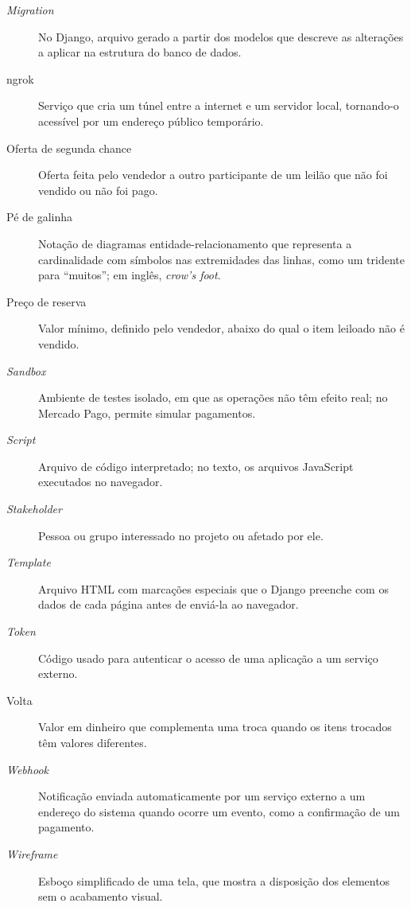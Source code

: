 \documentclass[
  12pt,
  a4paper,
  oneside,
  chapter=TITLE,
  subsection=TITLE,
  sumario=abnt-6027-2012,
  english,
  brazil
]{abntex2}
\begin{document}
\begin{description}
  \item[\emph{Migration}] No Django, arquivo gerado a partir dos modelos que descreve as alterações a aplicar na estrutura do banco de dados.
  \item[ngrok] Serviço que cria um túnel entre a internet e um servidor local, tornando-o acessível por um endereço público temporário.
  \item[Oferta de segunda chance] Oferta feita pelo vendedor a outro participante de um leilão que não foi vendido ou não foi pago.
  \item[Pé de galinha] Notação de diagramas entidade-relacionamento que representa a cardinalidade com símbolos nas extremidades das linhas, como um tridente para ``muitos''; em inglês, \emph{crow's foot}.
  \item[Preço de reserva] Valor mínimo, definido pelo vendedor, abaixo do qual o item leiloado não é vendido.
  \item[\emph{Sandbox}] Ambiente de testes isolado, em que as operações não têm efeito real; no Mercado Pago, permite simular pagamentos.
  \item[\emph{Script}] Arquivo de código interpretado; no texto, os arquivos JavaScript executados no navegador.
  \item[\emph{Stakeholder}] Pessoa ou grupo interessado no projeto ou afetado por ele.
  \item[\emph{Template}] Arquivo HTML com marcações especiais que o Django preenche com os dados de cada página antes de enviá-la ao navegador.
  \item[\emph{Token}] Código usado para autenticar o acesso de uma aplicação a um serviço externo.
  \item[Volta] Valor em dinheiro que complementa uma troca quando os itens trocados têm valores diferentes.
  \item[\emph{Webhook}] Notificação enviada automaticamente por um serviço externo a um endereço do sistema quando ocorre um evento, como a confirmação de um pagamento.
  \item[\emph{Wireframe}] Esboço simplificado de uma tela, que mostra a disposição dos elementos sem o acabamento visual.
\end{description}
\end{document}
